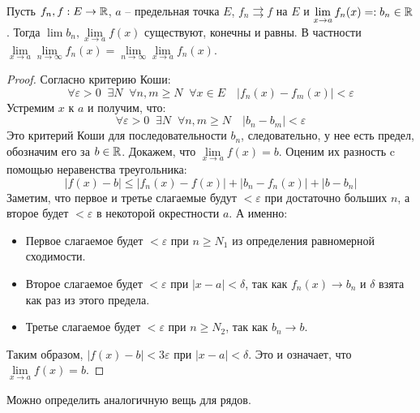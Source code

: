 \vspace*{5mm}

 \begin{theorem}
     Пусть $f_n, f : E \to \mathbb{R}$, $a$ -- предельная точка $E$, $f_n \rightrightarrows f$ на $E$ и $\lim\limits_{x \to a} f_n(x) =: b_n \in \mathbb{R}$. 
     Тогда $\lim b_n, \lim\limits_{x \to a} f(x)$ существуют, конечны и равны.
     В частности $\lim\limits_{x \to a} \lim\limits_{n \to \infty} f_n(x) =  \lim\limits_{n \to \infty} \lim\limits_{x \to a} f_n(x)$.
 \end{theorem}
 \begin{proof}
     Согласно критерию Коши: \[ \forall \varepsilon > 0 \;\; \exists N \;\; \forall n, m \geqslant N \;\; \forall x \in E \quad |f_n(x) - f_m(x)| < \varepsilon \]
     \quad Устремим $x$ к $a$ и получим, что: \[ \forall \varepsilon > 0 \;\; \exists N \;\; \forall n, m \geqslant N \quad |b_n - b_m| < \varepsilon  \]
     \quad Это критерий Коши для последовательности $b_n$, следовательно, у нее есть предел, обозначим его за $b \in \mathbb{R}$.
     Докажем, что $\lim\limits_{x \to a} f(x) = b$. Оценим их разность c помощью неравенства треугольника:
     \[ |f(x) - b| \leqslant |f_n(x) - f(x)| + |b_n - f_n(x)| + |b - b_n| \]
     \quad Заметим, что первое и третье слагаемые будут $< \varepsilon$ при достаточно больших $n$, а второе будет $< \varepsilon$ в некоторой окрестности $a$.
     А именно: \begin{itemize}
         \item Первое слагаемое будет $< \varepsilon$ при $n \geqslant N_1$ из определения равномерной сходимости. 
         \item Второе слагаемое будет $< \varepsilon$ при $|x - a| < \delta$, так как $f_n(x) \to b_n$ и $\delta$ взята как раз из этого предела.
         \item Третье слагаемое будет $< \varepsilon$ при $n \geqslant N_2$, так как $b_n \to b$.
     \end{itemize} 
     \quad Таким образом, $|f(x) - b| < 3\varepsilon$ при $|x - a| < \delta$. Это и означает, что $\lim\limits_{x \to a} f(x) = b$.
 \end{proof}

\vspace*{7mm}

Можно определить аналогичную вещь для рядов.

